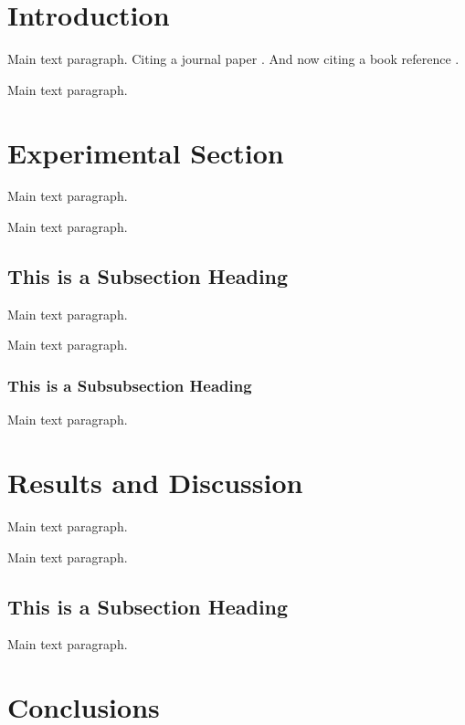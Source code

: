 \documentclass[jmse,article,submit,moreauthors,pdftex,12pt,a4paper]{mdpi}
\begin{document}

\section{Introduction}

Main text paragraph. Citing a journal paper \cite{ref-journal}. And now citing a book reference \cite{ref-book}.

Main text paragraph.


\section{Experimental Section}

Main text paragraph.


Main text paragraph.


\subsection{This is a Subsection Heading}

Main text paragraph.

Main text paragraph.


\subsubsection{This is a Subsubsection Heading}

Main text paragraph.


\section{Results and Discussion}

Main text paragraph.


Main text paragraph.

\subsection{This is a Subsection Heading}

Main text paragraph.


\section{Conclusions}
\end{document}
